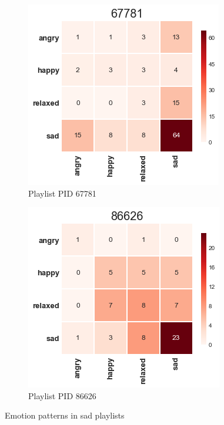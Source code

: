 \begin{figure}[H]
  \centering
  \begin{subfigure}[b]{0.49\linewidth}
    \includegraphics[width=\linewidth]{./chapters/chapter5/images/67781.png}
    \caption{Playlist PID 67781}
  \end{subfigure}
  \begin{subfigure}[b]{0.49\linewidth}
   \includegraphics[width=\linewidth]{./chapters/chapter5/images/86626.png}
    \caption{Playlist PID 86626}
  \end{subfigure}
  \caption{Emotion patterns in sad playlists}
  \label{fig:pattern4}
\end{figure}

